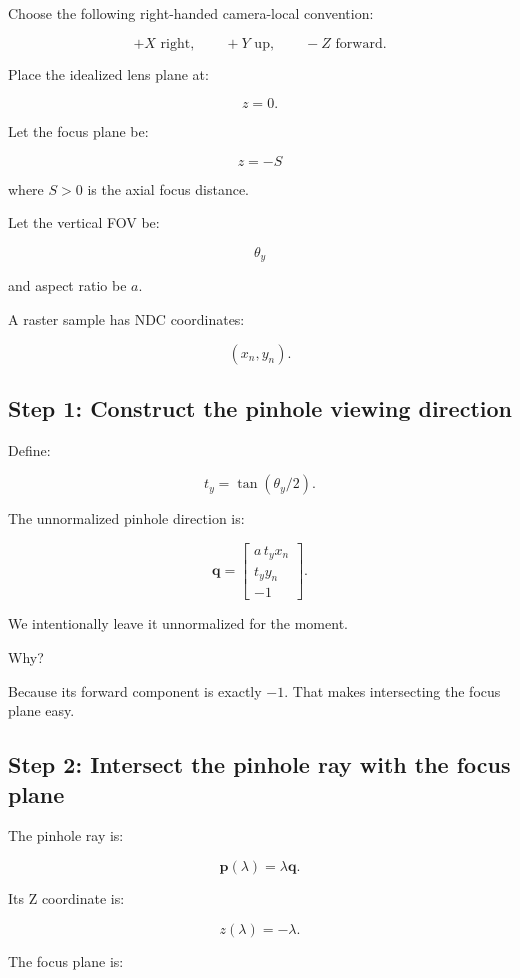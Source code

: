 Choose the following right-handed camera-local convention:

\[ +X\text{ right},\qquad+Y\text{ up},\qquad-Z\text{ forward}. \]

Place the idealized lens plane at:

\[ z=0. \]

Let the focus plane be:

\[ \boxed{z=-S} \]

where \(S>0\) is the axial focus distance.

Let the vertical FOV be:

\[ \theta_y \]

and aspect ratio be \(a\).

A raster sample has NDC coordinates:

\[ (x_n,y_n). \]

\subsection{Step 1: Construct the pinhole viewing direction}\label{02-foundations-ii-ch036-step-1-construct-the-pinhole-viewing-direction}

Define:

\[ t_y=\tan(\theta_y/2). \]

The unnormalized pinhole direction is:

\[ \boxed{ \mathbf q= \begin{bmatrix} a\,t_yx_n\\ t_yy_n\\ -1 \end{bmatrix}. } \]

We intentionally leave it unnormalized for the moment.

Why?

Because its forward component is exactly \(-1\). That makes intersecting the focus plane easy.

\subsection{Step 2: Intersect the pinhole ray with the focus plane}\label{02-foundations-ii-ch036-step-2-intersect-the-pinhole-ray-with-the-focus-plane}

The pinhole ray is:

\[ \mathbf p(\lambda)=\lambda\mathbf q. \]

Its Z coordinate is:

\[ z(\lambda)=-\lambda. \]

The focus plane is:

